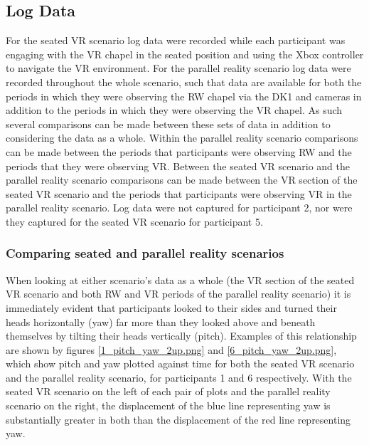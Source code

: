 
\subsection{Log Data}

For the seated VR scenario log data were recorded while each participant was engaging with the VR chapel in the seated position and using the Xbox controller to navigate the VR environment. For the parallel reality scenario log data were recorded throughout the whole scenario, such that data are available for both the periods in which they were observing the RW chapel via the DK1 and cameras in addition to the periods in which they were observing the VR chapel. As such several comparisons can be made between these sets of data in addition to considering the data as a whole. Within the parallel reality scenario comparisons can be made between the periods that participants were observing RW and the periods that they were observing VR. Between the seated VR scenario and the parallel reality scenario comparisons can be made between the VR section of the seated VR scenario and the periods that participants were observing VR in the parallel reality scenario. Log data were not captured for participant 2, nor were they captured for the seated VR scenario for participant 5.


\subsubsection{Comparing seated and parallel reality scenarios}

When looking at either scenario's data as a whole (the VR section of the seated VR scenario and both RW and VR periods of the parallel reality scenario) it is immediately evident that participants looked to their sides and turned their heads horizontally (yaw) far more than they looked above and beneath themselves by tilting their heads vertically (pitch). Examples of this relationship are shown by figures \ref{1_pitch_yaw_2up.png} and \ref{6_pitch_yaw_2up.png}, which show pitch and yaw plotted against time for both the seated VR scenario and the parallel reality scenario, for participants 1 and 6 respectively. With the seated VR scenario on the left of each pair of plots and the parallel reality scenario on the right, the displacement of the blue line representing yaw is substantially greater in both than the displacement of the red line representing yaw.

